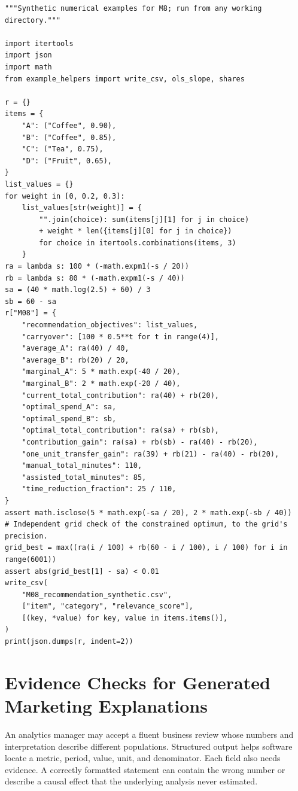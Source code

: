 \begin{Verbatim}[breaklines,breakanywhere,fontsize=\small]
"""Synthetic numerical examples for M8; run from any working directory."""

import itertools
import json
import math
from example_helpers import write_csv, ols_slope, shares

r = {}
items = {
    "A": ("Coffee", 0.90),
    "B": ("Coffee", 0.85),
    "C": ("Tea", 0.75),
    "D": ("Fruit", 0.65),
}
list_values = {}
for weight in [0, 0.2, 0.3]:
    list_values[str(weight)] = {
        "".join(choice): sum(items[j][1] for j in choice)
        + weight * len({items[j][0] for j in choice})
        for choice in itertools.combinations(items, 3)
    }
ra = lambda s: 100 * (-math.expm1(-s / 20))
rb = lambda s: 80 * (-math.expm1(-s / 40))
sa = (40 * math.log(2.5) + 60) / 3
sb = 60 - sa
r["M08"] = {
    "recommendation_objectives": list_values,
    "carryover": [100 * 0.5**t for t in range(4)],
    "average_A": ra(40) / 40,
    "average_B": rb(20) / 20,
    "marginal_A": 5 * math.exp(-40 / 20),
    "marginal_B": 2 * math.exp(-20 / 40),
    "current_total_contribution": ra(40) + rb(20),
    "optimal_spend_A": sa,
    "optimal_spend_B": sb,
    "optimal_total_contribution": ra(sa) + rb(sb),
    "contribution_gain": ra(sa) + rb(sb) - ra(40) - rb(20),
    "one_unit_transfer_gain": ra(39) + rb(21) - ra(40) - rb(20),
    "manual_total_minutes": 110,
    "assisted_total_minutes": 85,
    "time_reduction_fraction": 25 / 110,
}
assert math.isclose(5 * math.exp(-sa / 20), 2 * math.exp(-sb / 40))
# Independent grid check of the constrained optimum, to the grid's precision.
grid_best = max((ra(i / 100) + rb(60 - i / 100), i / 100) for i in range(6001))
assert abs(grid_best[1] - sa) < 0.01
write_csv(
    "M08_recommendation_synthetic.csv",
    ["item", "category", "relevance_score"],
    [(key, *value) for key, value in items.items()],
)
print(json.dumps(r, indent=2))
\end{Verbatim}

\hypertarget{M08-evidence-checks-for-generated-marketing-explanations}{%
\section{Evidence Checks for Generated Marketing
Explanations}\label{M08-evidence-checks-for-generated-marketing-explanations}}

\noindent An analytics manager may accept a fluent business review whose numbers
and interpretation describe different populations. Structured output
helps software locate a metric, period, value, unit, and denominator.
Each field also needs evidence. A correctly formatted statement can
contain the wrong number or describe a causal effect that the underlying
analysis never estimated.

